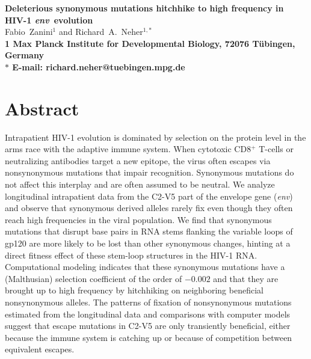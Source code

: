 \documentclass[10pt]{article}
\date{}
\newcommand{\env}{\textit{env}}
\newcommand{\shankaregion}{C2-V5}
\newcommand{\Title}{Deleterious synonymous mutations hitchhike to high frequency in HIV-1 \env~evolution}
\newcommand{\Affiliation}{Max Planck Institute for Developmental Biology, 72076 T\"ubingen, Germany}
\begin{document}
\begin{flushleft}
{\Large
\textbf{\Title}
}
\\
Fabio~Zanini$^{1}$ and
Richard~A.~Neher$^{1,\ast}$
\\
\bf{1} \Affiliation
\\
$\ast$ E-mail: richard.neher@tuebingen.mpg.de
\end{flushleft}

\section*{Abstract}
Intrapatient HIV-1 evolution is dominated by selection on the protein level in the
arms race with the adaptive immune system. When cytotoxic CD8${}^+$ T-cells or 
neutralizing antibodies
target a new epitope, the virus often escapes via nonsynonymous mutations that
impair recognition. Synonymous mutations do not affect this interplay and are
often assumed to be neutral.
We analyze longitudinal intrapatient data from the \shankaregion{} part of the
envelope gene (\env{}) and observe that synonymous derived alleles rarely
fix even though they often reach high frequencies in the viral population.
We find that synonymous mutations that disrupt base pairs in RNA stems flanking
the variable loops of gp120 are more likely to be lost than other synonymous
changes, hinting at a direct fitness effect of these stem-loop structures in the
HIV-1 RNA.
Computational modeling indicates that these synonymous mutations have a
(Malthusian) selection coefficient of the order of $-0.002$ and that they are
brought up to high frequency by hitchhiking on neighboring beneficial
nonsynonymous alleles.
The patterns of fixation of nonsynonymous mutations estimated from the
longitudinal data and comparisons with computer models
suggest that escape mutations in \shankaregion{} are only transiently
beneficial, either because the immune system is catching up or because of
competition between equivalent escapes.

\end{document}
